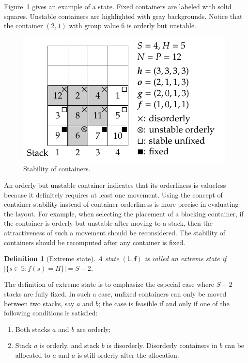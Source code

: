 \documentclass[review,3p,times,12pt,number]{elsarticle}\usepackage{amsmath}\usepackage{amssymb}
\newtheorem{definition}{Definition}
\begin{document}
Figure~\ref{fig:stable} gives an example of a state. Fixed containers are labeled with solid squares. Unstable containers are highlighted with gray backgrounds. Notice that the container $(2,1)$ with group value $6$ is orderly but unstable.

\begin{figure}[htbp]
\centering
\includegraphics{figs/stable.pdf}
\caption{Stability of containers.}
\label{fig:stable}
\end{figure}

An orderly but unstable container indicates that its orderliness is valueless because it definitely requires at least one movement.
Using the concept of container stability instead of container orderliness is more precise in evaluating the layout.
For example, when selecting the placement of a blocking container, if the container is orderly but unstable after moving to a stack, then the attractiveness of such a movement should be reconsidered. The stability of containers should be recomputed after any container is fixed.

\begin{definition}[Extreme state]
A state $(\mathsf{L},\boldsymbol{f})$ is called an extreme state if $|\{s\in\mathbb{S}: f(s)=H\}|= S-2$.
\end{definition}

The definition of extreme state is to emphasize the especial case where $S-2$ stacks are fully fixed. In such a case, unfixed containers can only be moved between two stacks, say $a$ and $b$; the case is feasible if and only if one of the following conditions is satisfied:
\begin{enumerate}
\item Both stacks $a$ and $b$ are orderly;
\item Stack $a$ is orderly, and stack $b$ is disorderly. Disorderly containers in $b$ can be allocated to $a$ and $a$ is still orderly after the allocation.
\end{enumerate}
\end{document}
